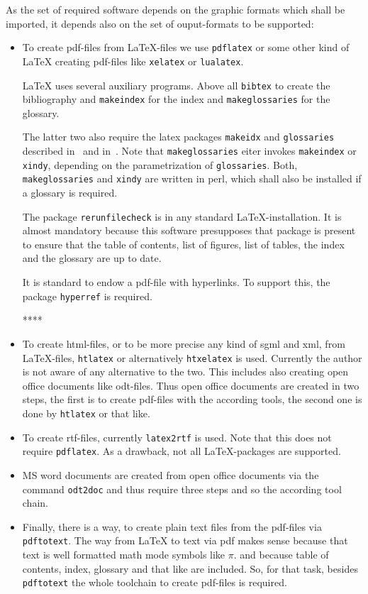 \documentclass[12pt]{book}
\newcommand{\gls}[1]{#1}
\renewcommand{\index}[1]{ }
\begin{document}
As the set of required software depends on the graphic formats 
which shall be imported, 
it depends also on the set of ouput-formats 
to be supported: 
%
\begin{itemize}
\item
To create pdf-files from \LaTeX-files we use \texttt{pdflatex} 
or some other kind of \LaTeX{} creating pdf-files 
like \texttt{xelatex} or \texttt{lualatex}. 
\index{pdflatex}\index{xelatex}\index{lualatex} 
\LaTeX{} uses several auxiliary programs. 
Above all \texttt{bibtex} to create the bibliography 
and \texttt{makeindex} for the index and \texttt{makeglossaries} for the glossary. 
\index{bibtex}\index{makeindex}\index{makeglossaries}
The latter two 
also require the latex packages \texttt{makeidx} and \texttt{glossaries} 
described in~\cite{MkidxShIdxP} and in~\cite{GloP}. 
Note that \texttt{makeglossaries} eiter invokes \texttt{makeindex} 
or \texttt{xindy}, depending on the parametrization of \texttt{glossaries}. 
Both, \texttt{makeglossaries} and \texttt{xindy} are written in perl, 
which shall also be installed if a glossary is required. 

The package \texttt{rerunfilecheck} is in any standard \LaTeX-installation. 
It is almost mandatory 
because this software presupposes that package is present  
to ensure that the table of contents, list of figures, list of tables, 
the index and the glossary are up to date. 

It is standard to endow a pdf-file with hyperlinks. 
To support this, the package \texttt{hyperref} is required. 

****
\item
To create \gls{html}-files, 
or to be more precise any kind of \gls{sgml} and \gls{xml}, 
from \LaTeX-files, \texttt{htlatex} or alternatively \texttt{htxelatex} is used. 
Currently the author is not aware of any alternative to the two. 
This includes also creating open office documents like odt-files. 
Thus open office documents are created in two steps, 
the first is to create pdf-files with the according tools, 
the second one is done by \texttt{htlatex} or that like. 
\index{htlatex}\index{htxelatex}
\item
To create rtf-files, currently \texttt{latex2rtf} is used. 
Note that this does not require \texttt{pdflatex}. 
As a drawback, not all \LaTeX-packages are supported. 
\index{latex2rtf}
\item
MS word documents are created from open office documents 
via the command \texttt{odt2doc} and thus require three steps 
and so the according tool chain. 
\index{odt2doc} 
\item
Finally, there is a way, to create plain text files from the pdf-files 
via \texttt{pdftotext}. 
The way from \LaTeX{} to text via pdf makes sense 
because that text is well formatted math mode symbols like $\pi$. 
and because table of contents, index, glossary and that like are included. 
So, for that task, besides \texttt{pdftotext} the whole toolchain to create
pdf-files is required. 
\index{pdftotext}
\end{itemize}
\end{document}
